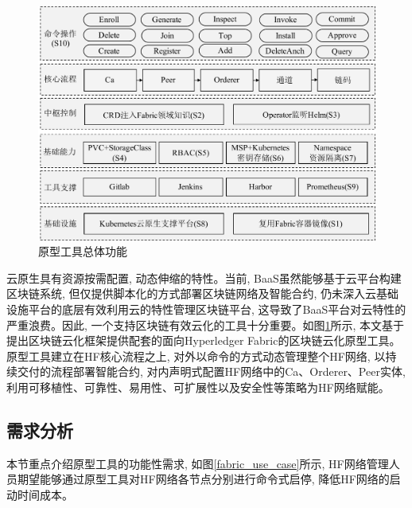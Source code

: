 \begin{figure}[!htbp] %
    \centering %
    \includegraphics[width=1.0\textwidth]{FIGs/chapter5/tool.pdf} %
    \caption{原型工具总体功能} %
    \label{toolstotal} %
\end{figure}%

云原生具有资源按需配置, 动态伸缩的特性。当前, BaaS虽然能够基于云平台构建区块链系统, 但仅提供脚本化的方式部署区块链网络及智能合约, 仍未深入云基础设施平台的底层有效利用云的特性管理区块链平台, 这导致了BaaS平台对云特性的严重浪费。因此, 一个支持区块链有效云化的工具十分重要。如图\ref{toolstotal}所示, 本文基于提出区块链云化框架提供配套的面向Hyperledger Fabric的区块链云化原型工具。原型工具建立在HF核心流程之上, 对外以命令的方式动态管理整个HF网络, 以持续交付的流程部署智能合约, 对内声明式配置HF网络中的Ca、Orderer、Peer实体, 利用可移植性、可靠性、易用性、可扩展性以及安全性等策略为HF网络赋能。


\subsection{需求分析} \label{section: requirement}

本节重点介绍原型工具的功能性需求, 如图\ref{fabric_use_case}所示, HF网络管理人员期望能够通过原型工具对HF网络各节点分别进行命令式启停, 降低HF网络的启动时间成本。

